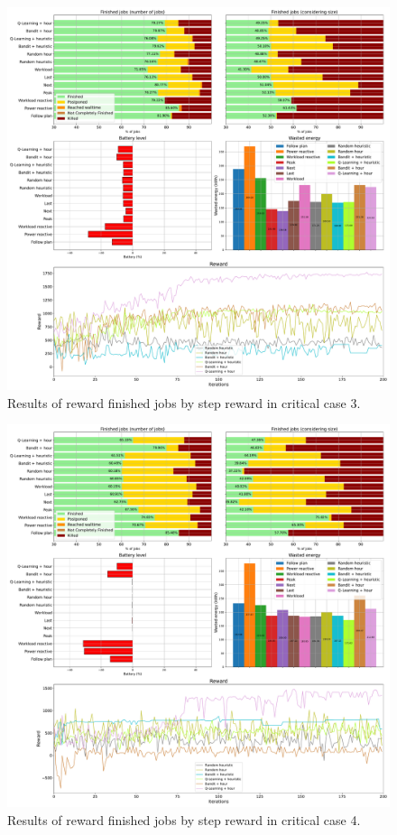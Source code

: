 \begin{figure}[!htb]
    \centering
    \includegraphics[scale=0.29]{Images/Learning_compensations/reward_finished_touched_profile_worst_workload_1_with_noise_state_delta.pdf}
    \caption{Results of reward finished jobs by step reward in critical case 3.}
    \label{fig:touched_reward_results_critical_3}
\end{figure}

\begin{figure}[!htb]
    \centering
    \includegraphics[scale=0.29]{Images/Learning_compensations/reward_finished_touched_profile_worst_workload_2_with_noise_state_delta.pdf}
    \caption{Results of reward finished jobs by step reward in critical case 4.}
    \label{fig:touched_reward_results_critical_4}
\end{figure}

